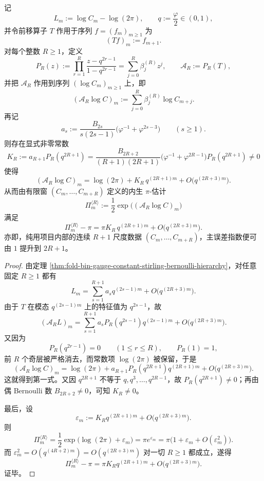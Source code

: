 \begin{theorem}\label{thm:conclusion-foldgauge-pi-oddlayer-annihilation-hierarchy}
记
\[
L_m:=\log C_m-\log(2\pi),
\qquad
q:=\frac{\varphi}{2}\in(0,1),
\]
并令前移算子 \(T\) 作用于序列 \(f=(f_m)_{m\ge 1}\) 为
\[
(Tf)_m:=f_{m+1}.
\]
对每个整数 \(R\ge 1\)，定义
\[
P_R(z):=\prod_{r=1}^{R}\frac{z-q^{2r-1}}{1-q^{2r-1}}
=
\sum_{j=0}^{R}\beta_j^{(R)}z^j,
\qquad
\mathcal A_R:=P_R(T),
\]
并把 \(\mathcal A_R\) 作用到序列 \((\log C_m)_{m\ge 1}\) 上，即
\[
(\mathcal A_R\log C)_m
:=
\sum_{j=0}^{R}\beta_j^{(R)}\log C_{m+j}.
\]
再记
\[
a_s:=
\frac{B_{2s}}{s(2s-1)}
\bigl(\varphi^{-1}+\varphi^{2s-3}\bigr)
\qquad (s\ge 1).
\]
则存在显式非零常数
\[
K_R:=a_{R+1}P_R(q^{2R+1})
=
\frac{B_{2R+2}}{(R+1)(2R+1)}
\bigl(\varphi^{-1}+\varphi^{2R-1}\bigr)
P_R(q^{2R+1})
\neq 0
\]
使得
\[
(\mathcal A_R\log C)_m
=
\log(2\pi)
+
K_R\,q^{(2R+1)m}
+
O\!\bigl(q^{(2R+3)m}\bigr).
\]
从而由有限窗 \((C_m,\dots,C_{m+R})\) 定义的内生 \(\pi\)-估计
\[
\Pi_m^{\langle R\rangle}
:=
\frac12\exp\!\bigl((\mathcal A_R\log C)_m\bigr)
\]
满足
\[
\Pi_m^{\langle R\rangle}-\pi
=
\pi K_R\,q^{(2R+1)m}
+
O\!\bigl(q^{(2R+3)m}\bigr).
\]
亦即，纯用项目内部的连续 \(R+1\) 尺度数据 \((C_m,\dots,C_{m+R})\)，主误差指数便可由 \(1\) 提升到 \(2R+1\)。
\end{theorem}
\begin{proof}
由定理 \ref{thm:fold-bin-gauge-constant-stirling-bernoulli-hierarchy}，对任意固定 \(R\ge 1\) 都有
\[
L_m
=
\sum_{s=1}^{R+1}a_s q^{(2s-1)m}
+
O\!\bigl(q^{(2R+3)m}\bigr).
\]
由于 \(T\) 在模态 \(q^{(2s-1)m}\) 上的特征值为 \(q^{2s-1}\)，故
\[
(\mathcal A_R L)_m
=
\sum_{s=1}^{R+1}a_s P_R(q^{2s-1})q^{(2s-1)m}
+
O\!\bigl(q^{(2R+3)m}\bigr).
\]
又因为
\[
P_R(q^{2r-1})=0\qquad(1\le r\le R),
\qquad
P_R(1)=1,
\]
前 \(R\) 个奇层被严格消去，而常数项 \(\log(2\pi)\) 被保留，于是
\[
(\mathcal A_R\log C)_m
=
\log(2\pi)
+
a_{R+1}P_R(q^{2R+1})q^{(2R+1)m}
+
O\!\bigl(q^{(2R+3)m}\bigr).
\]
这就得到第一式。又因 \(q^{2R+1}\) 不等于 \(q,q^3,\dots,q^{2R-1}\)，故 \(P_R(q^{2R+1})\neq 0\)；再由偶 Bernoulli 数 \(B_{2R+2}\neq 0\)，可知 \(K_R\neq 0\)。

最后，设
\[
\varepsilon_m:=K_R q^{(2R+1)m}+O\!\bigl(q^{(2R+3)m}\bigr).
\]
则
\[
\Pi_m^{\langle R\rangle}
=
\frac12\exp\!\bigl(\log(2\pi)+\varepsilon_m\bigr)
=
\pi e^{\varepsilon_m}
=
\pi\bigl(1+\varepsilon_m+O(\varepsilon_m^2)\bigr).
\]
而 \(\varepsilon_m^2=O(q^{(4R+2)m})=O(q^{(2R+3)m})\) 对一切 \(R\ge 1\) 都成立，遂得
\[
\Pi_m^{\langle R\rangle}-\pi
=
\pi K_R q^{(2R+1)m}+O\!\bigl(q^{(2R+3)m}\bigr).
\]
证毕。
\end{proof}

